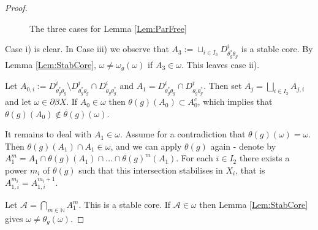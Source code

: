 \documentclass[11pt]{amsart}
\theoremstyle{plain}
\theoremstyle{definition}%
\theoremstyle{remark}%
\begin{document}
\begin{proof}
\begin{figure}[h]
\caption{The three cases for Lemma \ref{Lem:ParFree}}
\end{figure}

Case i) is clear. In Case iii) we observe that $A_{3}:= \sqcup_{i \in I_{3}} D_{\theta_{g}^{*}\theta_{g}}^{i}$ is a stable core. By Lemma \ref{Lem:StabCore}, $\omega\not = \omega_{g}(\omega)$ if $A_{3} \in \omega$. This leaves case ii).

Let $A_{0,i}:= D_{\theta_{g}^{*}\theta_{g}}^{i}\setminus D_{\theta_{g}^{*}\theta_{g}}^{i}\cap D_{\theta_{g}\theta_{g}^{*}}^{i} $ and $A_{1}=D_{\theta_{g}^{*}\theta_{g}}^{i}\cap D_{\theta_{g}\theta_{g}^{*}}^{i}$. Then set $A_{j}=\bigsqcup_{i \in I_{2}}A_{j,i}$ and let $\omega \in \partial \beta X$. If $A_{0} \in \omega$ then $\theta(g)(A_{0})  \subset A_{0}^{c}$, which implies that $\theta(g)(A_{0}) \not \in \theta(g)(\omega)$. 

It remains to deal with $A_{1} \in \omega$. Assume for a contradiction that $\theta(g)(\omega) = \omega$. Then $\theta(g)(A_{1})\cap A_{1} \in \omega$, and we can apply $\theta(g)$ again - denote by $A_{1}^{m}=A_{1} \cap \theta(g)(A_{1}) \cap ... \cap \theta(g)^{m}(A_{1})$. For each $i \in I_{2}$ there exists a power $m_{i}$ of $\theta(g)$ such that this intersection stabilises in $X_{i}$, that is $A_{1,i}^{m_{i}}=A_{1,i}^{m_{i}+1}$. 

Let $\mathcal{A} = \bigcap_{m\in \mathbb{N}} A_{1}^{m}$. This is a stable core. If $\mathcal{A} \in \omega$ then Lemma \ref{Lem:StabCore} gives $\omega \not = \theta_{g}(\omega)$.


\end{proof}
\end{document}
